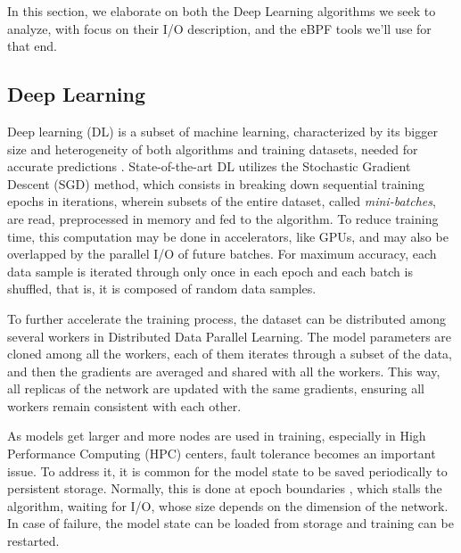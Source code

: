 \documentclass[conference]{IEEEtran}
\begin{document}

In this section, we elaborate on both the Deep Learning algorithms we seek to analyze, with focus on their I/O description, and the eBPF tools we'll use for that end.

\subsection{Deep Learning}

Deep learning (DL) is a subset of machine learning, characterized by its bigger size and heterogeneity of both algorithms and training datasets, needed for accurate predictions \cite{gradient}. State-of-the-art DL utilizes the Stochastic Gradient Descent (SGD) method, which consists in breaking down sequential training epochs in iterations, wherein subsets of the entire dataset, called \textit{mini-batches}, are read, preprocessed in memory and fed to the algorithm. To reduce training time, this computation may be done in accelerators, like GPUs, and may also be overlapped by the parallel I/O of future batches. For maximum accuracy, each data sample is iterated through only once in each epoch and each batch is shuffled, that is, it is composed of random data samples.

To further accelerate the training process, the dataset can be distributed among several workers in Distributed Data Parallel Learning. The model parameters are cloned among all the workers, each of them iterates through a subset of the data, and then the gradients are averaged and shared with all the workers. This way, all replicas of the network are updated with the same gradients, ensuring all workers remain consistent with each other.

As models get larger and more nodes are used in training, especially in High Performance Computing (HPC) centers, fault tolerance becomes an important issue. To address it, it is common for the model state to be saved periodically to persistent storage. Normally, this is done at epoch boundaries \cite{checkfreq}, which stalls the algorithm, waiting for I/O, whose size depends on the dimension of the network. In case of failure, the model state can be loaded from storage and training can be restarted.
\end{document}
